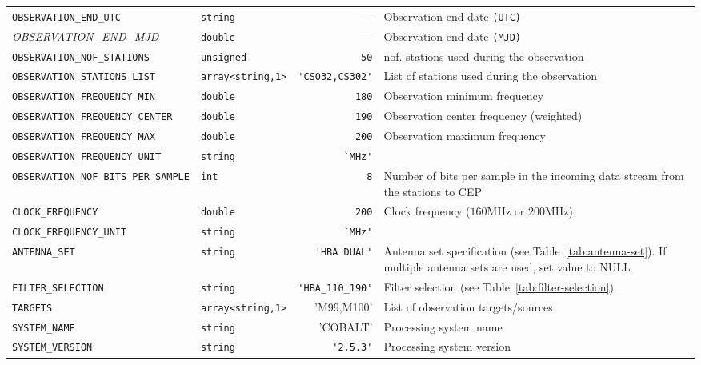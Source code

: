 \begin{table}[htbp]
\begin{tabular}{|lp{1.5cm}rp{5cm}|}
    \small{\texttt{OBSERVATION\_END\_UTC}} & \small\verb|string| & ---  &  Observation end date \verb|(UTC)| \\
    \small{\textit{OBSERVATION\_END\_MJD}} & \small\verb|double| & ---  &  Observation end date \verb|(MJD)| \\
    \small{\texttt{OBSERVATION\_NOF\_STATIONS}}  & \small\verb|unsigned|& \verb|50|  &  nof. stations used during the observation \\
    \small{\texttt{OBSERVATION\_STATIONS\_LIST}} & \small\verb|array<string,1>| & \verb|'CS032,CS302'|  &  List of stations used during the observation \\
    \small{\texttt{OBSERVATION\_FREQUENCY\_MIN}} & \small\verb|double| & \verb|180|  &  Observation minimum frequency \\
    \small{\texttt{OBSERVATION\_FREQUENCY\_CENTER}} & \small\verb|double| & \verb|190|  &  Observation center frequency (weighted) \\
    \small{\texttt{OBSERVATION\_FREQUENCY\_MAX}} & \small\verb|double| & \verb|200|  &  Observation maximum frequency\\
    \small\verb|OBSERVATION_FREQUENCY_UNIT| & \small\verb|string| &
    \verb|`MHz'|  &  \\
    \small\verb|OBSERVATION_NOF_BITS_PER_SAMPLE| & \small\verb|int| & \verb|8|  & 
    Number of bits per sample in the incoming data stream from the
    stations to CEP \\
    \small\verb|CLOCK_FREQUENCY| & \small\verb|double| & \verb|200|  &  Clock
    frequency ($160 \mathrm{MHz}$ or $200 \mathrm{MHz}$). \\
    \small{\verb|CLOCK_FREQUENCY_UNIT|} & \small\verb|string| & \verb|`MHz'| &  \\
    \small\verb|ANTENNA_SET| & \small\verb|string| & \verb|'HBA DUAL'|  &  Antenna set specification (see Table~\ref{tab:antenna-set}). If multiple antenna sets are used, set value to NULL\\
    \small \verb|FILTER_SELECTION| & \small\verb|string| & \verb|'HBA_110_190'|  &  Filter selection (see Table~\ref{tab:filter-selection}).\\
    \small \verb|TARGETS| & \small\verb|array<string,1>| & 'M99,M100'  &  List of observation targets/sources \\
    \small \verb|SYSTEM_NAME| & \small\verb|string| & 'COBALT'  &  Processing system name \\
    \small \verb|SYSTEM_VERSION| & \small\verb|string| & \verb|'2.5.3'|  &  Processing system version \\

\end{tabular}
\end{table}
